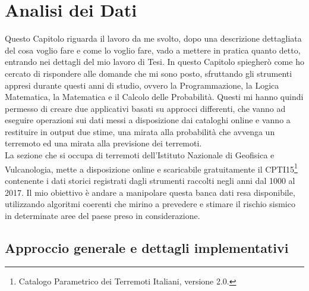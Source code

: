 \chapter{Analisi dei Dati}\label{iTerremotiInItalia}
Questo Capitolo riguarda il lavoro da me svolto, dopo una descrizione dettagliata del cosa voglio fare e come lo voglio fare, vado a mettere in pratica quanto detto, entrando nei dettagli del mio lavoro di Tesi. In questo Capitolo spiegher\`o come ho cercato di rispondere alle domande che mi sono posto, sfruttando gli strumenti appresi durante questi anni di studio, ovvero la Programmazione, la Logica Matematica, la Matematica e il Calcolo delle Probabilit\`a. Questi mi hanno quindi permesso di creare due applicativi basati su approcci differenti, che vanno ad eseguire operazioni sui dati messi a disposizione dai cataloghi online e vanno a restituire in output due stime, una mirata alla probabilit\`a che avvenga un terremoto ed una mirata alla previsione dei terremoti.\\
La sezione che si occupa di terremoti dell'Istituto Nazionale di Geofisica e Vulcanologia, mette a disposizione online e scaricabile gratuitamente il CPTI15\footnote{Catalogo Parametrico dei Terremoti Italiani, versione 2.0.} \cite{CPTI15} contenente i dati storici registrati dagli strumenti raccolti negli anni dal 1000 al 2017. Il mio obiettivo \`e andare a manipolare questa banca dati resa disponibile, utilizzando algoritmi coerenti che mirino a prevedere e stimare il rischio sismico in determinate aree del paese preso in considerazione.

\section{Approccio generale e dettagli implementativi}\label{dettagliImpl}

